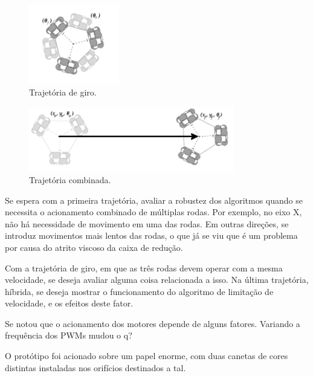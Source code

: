 \begin{figure}[h]
  \centering
  \includegraphics[width = 0.35\textwidth]{imagens/giro}
  \caption{Trajetória de giro.}
  \label{fig:giro}
\end{figure}

\begin{figure}[h]
  \centering
  \includegraphics[width = 0.8\textwidth]{imagens/hibrida}
  \caption{Trajetória combinada.}
  \label{fig:hibrida}
\end{figure}

Se espera com a primeira trajetória, avaliar a robustez dos algoritmos quando se necessita o acionamento combinado de múltiplas rodas. Por exemplo, no eixo X, não há necessidade de movimento em uma das rodas. Em outras direções, se introduz movimentos mais lentos das rodas, o que já se viu que é um problema por causa do atrito viscoso da caixa de redução.

Com a trajetória de giro, em que as três rodas devem operar com a mesma velocidade, se deseja avaliar alguma coisa relacionada a isso. Na última trajetória, híbrida, se deseja mostrar o funcionamento do algoritmo de limitação de velocidade, e os efeitos deste fator.

Se notou que o acionamento dos motores depende de alguns fatores. Variando a frequência dos PWMs mudou o q?

O protótipo foi acionado sobre um papel enorme, com duas canetas de cores distintas instaladas nos orifícios destinados a tal.
